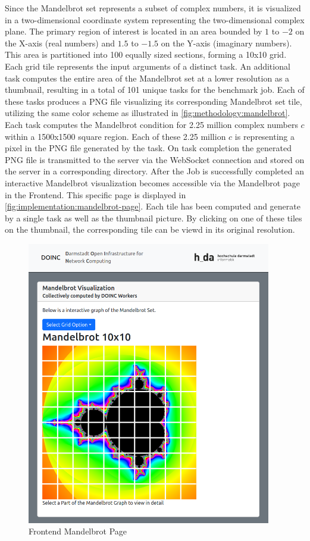 Since the Mandelbrot set represents a subset of complex numbers, it is visualized in a two-dimensional coordinate system representing the two-dimensional complex plane. The primary region of interest is located in an area bounded by $1$ to $-2$ on the X-axis (real numbers) and $1.5$ to $-1.5$ on the Y-axis (imaginary numbers). This area is partitioned into 100 equally sized sections, forming a 10x10 grid. Each grid tile represents the input arguments of a distinct task. An additional task computes the entire area of the Mandelbrot set at a lower resolution as a thumbnail, resulting in a total of 101 unique tasks for the benchmark job. Each of these tasks produces a \ac{PNG} file visualizing its corresponding Mandelbrot set tile, utilizing the same color scheme as illustrated in \autoref{fig:methodology:mandelbrot}. Each task computes the Mandelbrot condition for 2.25 million complex numbers $c$ within a 1500x1500 square region. Each of these 2.25 million $c$ is representing a pixel in the \ac{PNG} file generated by the task. On task completion the generated \ac{PNG} file is transmitted to the server via the WebSocket connection and stored on the server in a corresponding directory. After the Job is successfully completed an interactive Mandelbrot visualization becomes accessible via the Mandelbrot page in the Frontend. This specific page is displayed in \autoref{fig:implementation:mandelbrot-page}. Each tile has been computed and generate by a single task as well as the thumbnail picture. By clicking on one of these tiles on the thumbnail, the corresponding tile can be viewd in its original resolution.
\begin{figure}[htbp]
    \centering
    \includegraphics[width=0.95\textwidth]{gfx/figures/mandelbrot-page.png}
    \caption{Frontend Mandelbrot Page}
    \label{fig:implementation:mandelbrot-page}
\end{figure}
